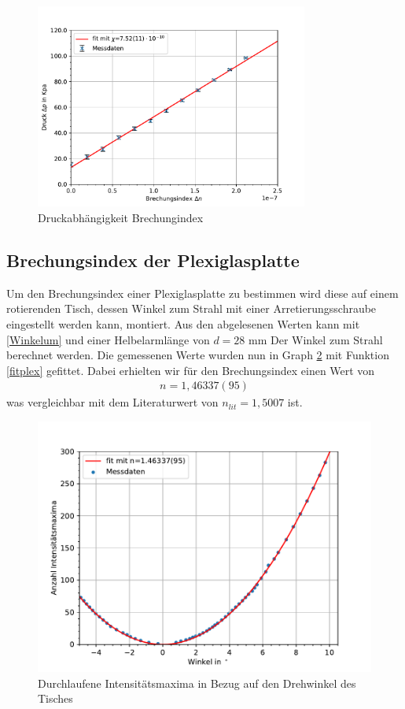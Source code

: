 \documentclass[11pt, a4paper]{article}
\begin{document}
    \begin{figure}
        \centering
        \includegraphics[width=0.8\textwidth]{./plots/druck.pdf}
        \caption{Druckabhängigkeit Brechungindex}
        \label{fig:druck}
    \end{figure}

    \subsection{Brechungsindex der Plexiglasplatte}
    Um den Brechungsindex einer Plexiglasplatte zu bestimmen wird diese auf einem rotierenden Tisch, dessen Winkel zum Strahl mit einer Arretierungsschraube eingestellt werden kann, montiert.
    Aus den abgelesenen Werten kann mit \ref{Winkelum} und einer Helbelarmlänge von $d = 28$ mm Der Winkel zum Strahl berechnet werden.
    Die gemessenen Werte wurden nun in Graph \ref{fig:plexiplot} mit Funktion \ref{fitplex} gefittet. Dabei erhielten wir für den Brechungsindex einen Wert von
    \begin{align}
        n = 1,46337(95)
    \end{align}
    was vergleichbar mit dem Literaturwert von $n_{lit} = 1,5007$ \cite[Siehe:]{refdat} ist.
    \begin{figure}[!h]
        \centering
        \includegraphics[width=\textwidth]{./plots/plexi.pdf}

        \caption{Durchlaufene Intensitätsmaxima in Bezug auf den Drehwinkel des Tisches}
        \label{fig:plexiplot}
    \end{figure}
\end{document}
